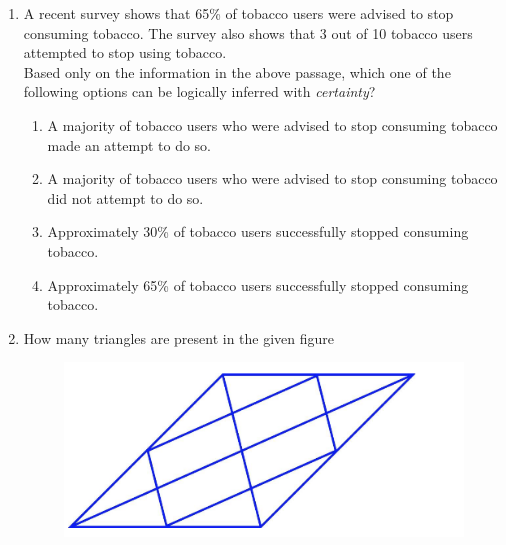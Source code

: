 \documentclass[12pt]{article}
\theoremstyle{remark}
\begin{document}
\begin{enumerate}
\begin{enumerate}
 \end{enumerate}
\hfill{}
\item A recent survey shows that 65\% of tobacco users were advised to stop consuming tobacco. The survey also shows that 3 out of 10 tobacco users attempted to stop using tobacco.\\
Based only on the information in the above passage, which one of the following options can be logically inferred with \textit{certainty}?\\ 
\begin{enumerate}
\item A majority of tobacco users who were advised to stop consuming tobacco made an attempt to do so.
\item A majority of tobacco users who were advised to stop consuming tobacco did not attempt to do so. 
\item Approximately 30\% of tobacco users successfully stopped consuming tobacco. 
\item Approximately 65\% of tobacco users successfully stopped consuming tobacco.
\end{enumerate}
\hfill{}
\item How many triangles are present in the given figure\\
\begin{centering}
\begin{figure}[H] 
\includegraphics{Figs/Q5.png}\\
\caption{}
\label{Fig:1.1} 
\end{figure}
\end{centering}
\begin{enumerate} \begin{multicols}{2}

\end{multicols}
\end{enumerate}
\end{enumerate}
\end{document}
